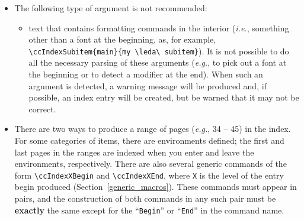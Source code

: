 \documentclass{article}
\begin{document}
\begin{itemize}
\begin{itemize}
                 Also, if you have defined a command that expands
                 to something like \verb|{\bf text}| (with or without the 
                 braces), this will cause {\tt makeindex} to complain since 
                 the indexing macros cannot pick off the font in order to
                 produce the proper
                 formatting of ``text''. (The shortcut commands such as
                 \verb|\leda|, which are allowed as stand-alone arguments, 
                 are handled as special cases.)
         \end{itemize}
   \item The following type of argument is not recommended:
         \begin{itemize}
           \item text that contains formatting commands in the interior%
                 ({\it i.e.}, something other than a font at the beginning, as,
                 for example, \verb|\ccIndexSubitem{main}{my \leda\ subitem}|). 
                 It is not possible to do all the necessary parsing of these
                 arguments ({\it e.g.}, to pick out a font at the beginning 
                 or to detect a modifier at the end). When such an
                 argument is detected, a warning message will be produced and,
                 if possible, an index entry will be created, but be warned
                 that it may not be correct.
         \end{itemize}
   \item There are two ways to produce a range of pages ({\em e.g.}, 34 -- 45)
          in the index.  For some categories of items, there 
         are environments 
         defined; the first and last pages in the ranges are indexed when
         you enter and leave the environments, respectively.  There are also
         several generic commands of the form \verb|\ccIndexXBegin| and 
         \verb|\ccIndexXEnd|, where {\tt X} is the level of the entry begin 
         produced (Section~\ref{generic_macros}).  These commands must 
         appear in pairs, and the construction of both commands in any such 
         pair must be {\bf exactly} the same 
         except for the ``{\tt Begin}'' or ``{\tt End}'' in the command name.


\end{itemize}
\end{document}
